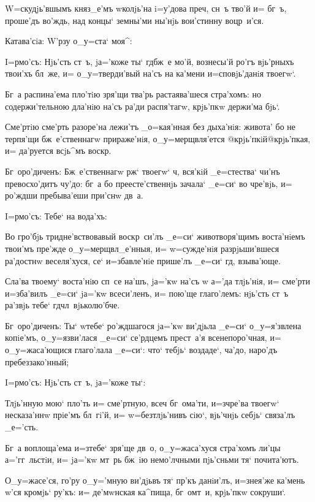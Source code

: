 W=скудjь'вшымъ княз_е'мъ w\т колjь'на i=у'дова 
преч, сн~ъ тво'й и= бг~ъ, проше'дъ во'ждь, над\ъ 
концы` земны'ми ны'нjь вои'стинну воцр~и'ся. 

Катава'сiа: W'рзу о_у=ста` моя^:


I=рмо'съ: Нjь'сть ст~ъ, jа='коже ты` гд бж~е мо'й, 
вознесы'й ро'гъ вjь'рныхъ твои'хъ бл~же, и= 
о_у=тверди'вый на'съ на ка'мени и=сповjь'данiя твоегw`.

Бг~а распина'ема пло'тiю зря'щи тва'рь растаява'шеся 
стра'хомъ: но содержи'тельною дла'нiю на'съ ра'ди 
распя'тагw, крjь'пкw держи'ма бjь`.

Сме'ртiю сме'рть разоре'на лежи'тъ _о=кая'нная без\ъ 
дыха'нiя: живота' бо не терпя'щи бж~е'ственнагw 
прираже'нiя, о_у=мерщвля'ется @крjь'пкiй@{крjь'пкая}, и= 
да'руется всjь^мъ воскр.

Бг~оро'диченъ: Бж~е'ственнагw рж` твоегw` ч, 
вся'кiй _е=стества` чи'нъ превосхо'дитъ чу'до: бг~а бо 
преесте'ственнjь зачала` _е=си` во чре'вjь, и= ро'ждши 
пребыва'еши при'снw дв~а.

 I=рмо'съ: Тебе` на вода'хъ:

Во гро'бjь тридне'вствовавый воскр~си'лъ _е=си` 
животворя'щимъ воста'нiемъ твои'мъ пре'жде 
о_у=мерщвл_е'нныя, и= w=сужде'нiя разрjьши'вшеся 
ра'достнw веселя'хуся, се` и=збавле'нiе прише'лъ _е=си` 
гд, взыва'юще.

Сла'ва твоему` воста'нiю сп~се на'шъ, jа='кw на'съ w\т 
а='да тлjь'нiя, и= сме'рти и=зба'вилъ _е=си` jа='кw 
всеси'ленъ, и= пою'ще глаго'лемъ: нjь'сть ст~ъ ра'звjь 
тебе` гд чл~вjьколю'бче.

Бг~оро'диченъ: Ты` w\т тебе` ро'ждшагося jа='кw 
ви'дjьла _е=си` о_у=я'звлена копiе'мъ, о_у=язви'лася 
_е=си` се'рдцемъ прест~а'я всенепоро'чная, и= 
о_у=жаса'ющися глаго'лала _е=си`: что` тебjь` воздаде`, 
ча'до, наро'дъ пребеззако'нный; 

 I=рмо'съ: Нjь'сть ст~ъ, jа='коже ты`:

Тлjь'нную мою` пло'ть и= сме'ртную, всеч 
бг~ома'ти, и=з\ъ чре'ва твоегw` несказа'ннw прiе'мъ 
бл~гi'й, и= w=безтлjь'нивъ сiю`, вjь'чнjь себjь` связа'лъ 
_е='сть. 

Бг~а воплоща'ема и=з\ъ тебе` зря'ще дв~о, 
о_у=жаса'хуся стра'хомъ ли'цы а='гг~льстiи, и= jа='кw 
мт~рь бж~iю немо'лчными пjь'сньми тя` почита'ютъ.

О_у=жасе'ся, го'ру о_у='мную ви'дjьвъ тя` пр'къ 
данiи'лъ, и=з\ъ нея'же ка'мень w'ся кромjь` ру'къ: 
и= де'мwнская ка^пища, бг~омт~и, крjь'пкw сокруши`.

